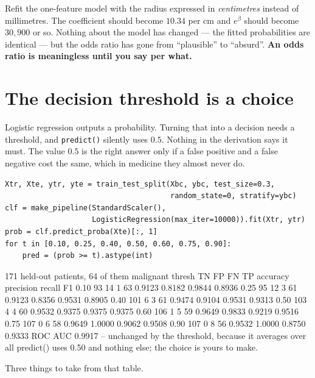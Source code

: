 \documentclass[11pt]{article}
\begin{document}
\begin{tryit}
Refit the one-feature model with the radius expressed in \emph{centimetres}
instead of millimetres. The coefficient should become $10.34$ per cm and
$e^{\beta}$ should become $30{,}900$ or so. Nothing about the model has
changed --- the fitted probabilities are identical --- but the odds ratio has
gone from ``plausible'' to ``absurd''. \textbf{An odds ratio is meaningless
until you say per what.}
\end{tryit}

\section{The decision threshold is a choice}
\label{sec:thresh}

Logistic regression outputs a probability. Turning that into a decision needs
a threshold, and \texttt{predict()} silently uses $0.5$. Nothing in the
derivation says it must. The value $0.5$ is the right answer only if a false
positive and a false negative cost the same, which in medicine they almost
never do.

\begin{lstlisting}
Xtr, Xte, ytr, yte = train_test_split(Xbc, ybc, test_size=0.3,
                                      random_state=0, stratify=ybc)
clf = make_pipeline(StandardScaler(),
                    LogisticRegression(max_iter=10000)).fit(Xtr, ytr)
prob = clf.predict_proba(Xte)[:, 1]
for t in [0.10, 0.25, 0.40, 0.50, 0.60, 0.75, 0.90]:
    pred = (prob >= t).astype(int)
\end{lstlisting}
\begin{codeout}
171 held-out patients, 64 of them malignant
thresh   TN   FP   FN   TP   accuracy  precision  recall     F1
 0.10    93   14    1   63    0.9123     0.8182   0.9844  0.8936
 0.25    95   12    3   61    0.9123     0.8356   0.9531  0.8905
 0.40   101    6    3   61    0.9474     0.9104   0.9531  0.9313
 0.50   103    4    4   60    0.9532     0.9375   0.9375  0.9375
 0.60   106    1    5   59    0.9649     0.9833   0.9219  0.9516
 0.75   107    0    6   58    0.9649     1.0000   0.9062  0.9508
 0.90   107    0    8   56    0.9532     1.0000   0.8750  0.9333
ROC AUC 0.9917 -- unchanged by the threshold, because it averages over all
predict() uses 0.50 and nothing else; the choice is yours to make.
\end{codeout}

Three things to take from that table.
\end{document}
